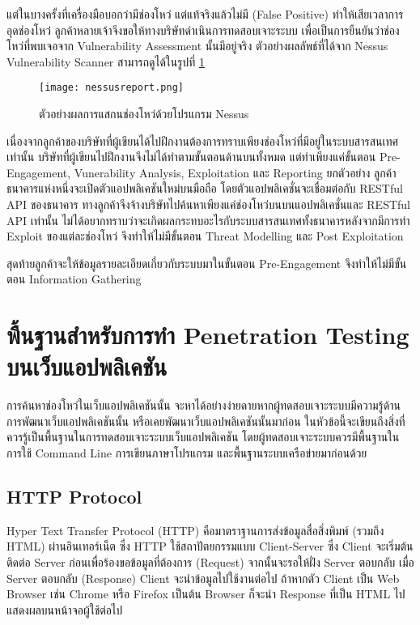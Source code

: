 แต่ในบางครั้งที่เครื่องมือบอกว่ามีช่องโหว่ แต่แท้จริงแล้วไม่มี (False Positive) ทำให้เสียเวลาการอุดช่องโหว่ ลูกค้าหลายเจ้าจึงขอให้ทางบริษัทดำเนินการทดสอบเจาะระบบ เพื่อเป็นการยืนยันว่าช่องโหว่ที่พบเจอจาก Vulnerability Assessment นั้นมีอยู่จริง ตัวอย่างผลลัพธ์ที่ได้จาก Nessus Vulnerability Scanner สามารถดูได้ในรูปที่ \ref{Fig:nessusreport}

\begin{figure}[h]
	\centering
	\texttt{[image: nessusreport.png]}
	\caption{ตัวอย่างผลการแสกนช่องโหว่ด้วยโปรแกรม Nessus}
	\label{Fig:nessusreport}
\end{figure}

เนื่องจากลูกค้าของบริษัทที่ผู้เขียนได้ไปฝึกงานต้องการทราบเพียงช่องโหว่ที่มีอยู่ในระบบสารสนเทศเท่านั้น บริษัทที่ผู้เขียนไปฝึกงานจึงไม่ได้ทำตามขั้นตอนด้านบนทั้งหมด  แต่ทำเพียงแค่ขั้นตอน Pre-Engagement, Vunerability Analysis, Exploitation และ Reporting  ยกตัวอย่าง ลูกค้าธนาคารแห่งหนึ่งจะเปิดตัวแอปพลิเคชันใหม่บนมือถือ โดยตัวแอปพลิเคชั่นจะเชื่อมต่อกับ RESTful API ของธนาคาร ทางลูกค้าจึงจ้างบริษัทไปค้นหาเพียงแค่ช่องโหว่บนบนแอปพลิเคชั่นและ RESTful API เท่านั้น ไม่ได้อยากทราบว่าจะเกิดผลกระทบอะไรกับระบบสารสนเทศทั้งธนาคารหลังจากมีการทำ Exploit ของแต่ละช่องโหว่ จึงทำให้ไม่มีขั้นตอน Threat Modelling และ Post Exploitation

สุดท้ายลูกค้าจะให้ข้อมูลรายละเอียดเกี่ยวกับระบบมาในขั้นตอน Pre-Engagement จึงทำให้ไม่มีขั้นตอน Information Gathering

\section{พื้นฐานสำหรับการทำ Penetration Testing บนเว็บแอปพลิเคชัน}

การค้นหาช่องโหว่ในเว็บแอปพลิเคชันนั้น จะหาได้อย่างง่ายดายหากผู้ทดสอบเจาะระบบมีความรู้ด้านการพัฒนาเว็บแอปพลิเคชันนั้น หรือเคยพัฒนาเว็บแอปพลิเคชันนั้นมาก่อน ในหัวข้อนี้จะเขียนถึงสิ่งที่ควรรู้เป็นพื้นฐานในการทดสอบเจาะระบบเว็บแอปพลิเคชัน โดยผู้ทดสอบเจาะระบบควรมีพื้นฐานในการใช้ Command Line การเขียนภาษาโปรแกรม และพื้นฐานระบบเครือข่ายมาก่อนด้วย

\subsection{HTTP Protocol}

Hyper Text Transfer Protocol (HTTP) คือมาตราฐานการส่งข้อมูลสื่อสิ่งพิมพ์ (รวมถึง HTML) ผ่านอินเทอร์เน็ต ซึ่ง HTTP  ใช้สถาปัตยกรรมแบบ Client-Server \cite{httpmdn} ซึ่ง Client จะเริ่มต้นติดต่อ Server ก่อนเพื่อร้องขอข้อมูลที่ต้องการ (Request) จากนั้นจะรอให้ฝั่ง Server ตอบกลับ เมื่อ Server ตอบกลับ (Response) Client จะนำข้อมูลไปใช้งานต่อไป ถ้าหากตัว Client เป็น Web Browser เช่น Chrome หรือ Firefox เป็นต้น Browser ก็จะนำ Response ที่เป็น HTML ไปแสดงผลบนหน้าจอผู้ใช้ต่อไป \cite{httpmessmdn} 

